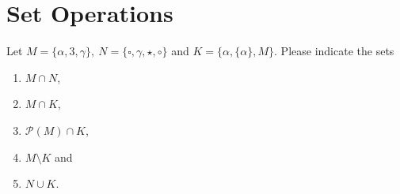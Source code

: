 \section{Set Operations}
	Let $M = \lbrace \alpha, 3, \gamma\rbrace,~ N = \lbrace \square, \gamma, \star, \circ \rbrace$ and $K = \lbrace \alpha, \lbrace \alpha \rbrace, M \rbrace$. Please indicate the sets \begin{enumerate}
		\item $M \cap N$,
		\item $M \cap K$,
		\item $\mathcal{P}(M) \cap K$,
		\item $M \setminus K$ and
		\item $N \cup K$.
	\end{enumerate}